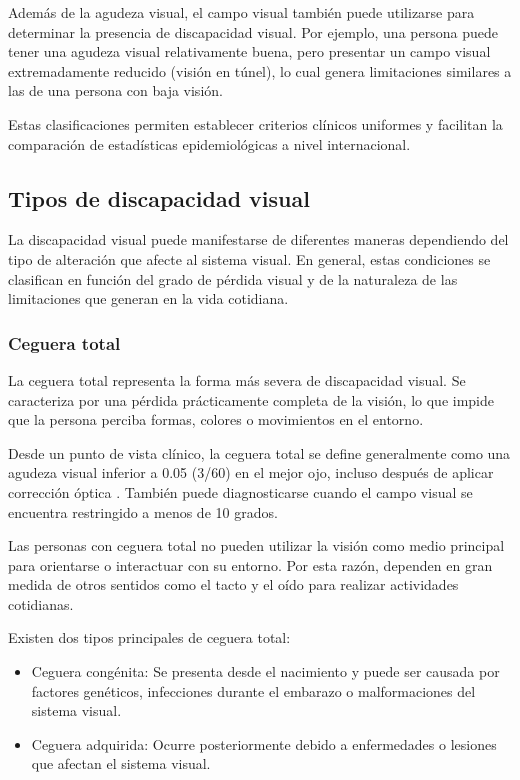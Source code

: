 Además de la agudeza visual, el campo visual también puede utilizarse para determinar la presencia de discapacidad visual. Por ejemplo, una persona puede tener una agudeza visual relativamente buena, pero presentar un campo visual extremadamente reducido (visión en túnel), lo cual genera limitaciones similares a las de una persona con baja visión.

Estas clasificaciones permiten establecer criterios clínicos uniformes y facilitan la comparación de estadísticas epidemiológicas a nivel internacional.

\subsection{Tipos de discapacidad visual}
La discapacidad visual puede manifestarse de diferentes maneras dependiendo del tipo de alteración que afecte al sistema visual. En general, estas condiciones se clasifican en función del grado de pérdida visual y de la naturaleza de las limitaciones que generan en la vida cotidiana.
\subsubsection{Ceguera total}
La ceguera total representa la forma más severa de discapacidad visual. Se caracteriza por una pérdida prácticamente completa de la visión, lo que impide que la persona perciba formas, colores o movimientos en el entorno.

Desde un punto de vista clínico, la ceguera total se define generalmente como una agudeza visual inferior a 0.05 (3/60) en el mejor ojo, incluso después de aplicar corrección óptica \cite{once_bajavision}. También puede diagnosticarse cuando el campo visual se encuentra restringido a menos de 10 grados.

Las personas con ceguera total no pueden utilizar la visión como medio principal para orientarse o interactuar con su entorno. Por esta razón, dependen en gran medida de otros sentidos como el tacto y el oído para realizar actividades cotidianas.

Existen dos tipos principales de ceguera total:
\begin{itemize}
    \item Ceguera congénita:
Se presenta desde el nacimiento y puede ser causada por factores genéticos, infecciones durante el embarazo o malformaciones del sistema visual.
\item Ceguera adquirida:
Ocurre posteriormente debido a enfermedades o lesiones que afectan el sistema visual.
\end{itemize}

